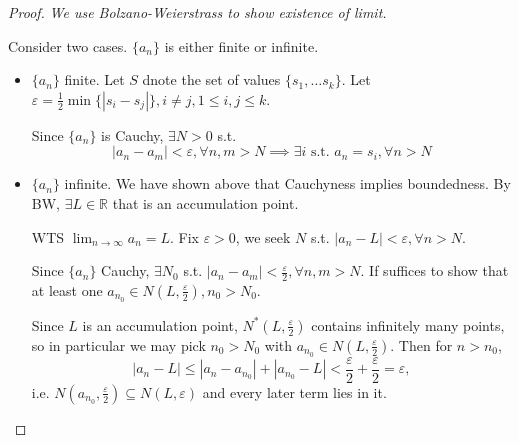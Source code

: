 \begin{proof}
    \textit{We use Bolzano-Weierstrass to show existence of limit.}
    \medskip 

    Consider two cases. $\{ a_n \} $ is either finite or infinite. 
    \begin{itemize}
        \item $\{ a_n \} $ finite. Let $S$ dnote the set of values $ \{ s_1, \hdots s_k \} $. 
        Let $\varepsilon = \frac{1}{2} \min \{ |s_i - s_j| \}, i \neq j, 1 \leq i, j \leq k $. 
        \medskip 

        Since $\{ a_n \} $ is Cauchy, $\exists N > 0$ s.t. 
        \[
            |a_n - a_m| < \varepsilon, \forall n, m > N \implies 
            \exists i \text{ s.t. } a_n = s_i, \forall n > N
        \]
        \item $ \{ a_n \} $ infinite. 
        We have shown above that Cauchyness implies boundedness.
        By BW, $\exists L \in \mathbb{R}$
        that is an accumulation point. 
        \medskip 

        WTS $\lim_{n \to \infty}a_n = L$. Fix $\varepsilon > 0$, 
        we seek $N$ s.t. $|a_n - L| < \varepsilon, \forall n > N$. 
        \medskip 

        Since $\{ a_n \} $ Cauchy, $\exists N_0$ s.t. 
        $|a_n - a_m | < \frac{ \varepsilon}{2}, \forall n, m > N$.
        If suffices to show that at least one
        $a_{n_0} \in N\left(L, \frac{\varepsilon}{2} \right), n_0 > N_0$.

        Since $L$ is an accumulation point, $N^*\left(L, \frac{\varepsilon}{2}\right)$
        contains infinitely many points, so in particular we may pick
        $n_0 > N_0$ with $a_{n_0} \in N\left(L, \frac{\varepsilon}{2}\right)$.
        Then for $n > n_0$,
        \[
            |a_n - L| \leq |a_n - a_{n_0}| + |a_{n_0} - L|
            < \frac{\varepsilon}{2} + \frac{\varepsilon}{2} = \varepsilon,
        \]
        i.e. $N\left(a_{n_0}, \frac{\varepsilon}{2}\right) \subseteq N(L,\varepsilon)$
        and every later term lies in it.
        \medskip

        \begin{center}
\end{center}
\end{itemize}
\end{proof}
